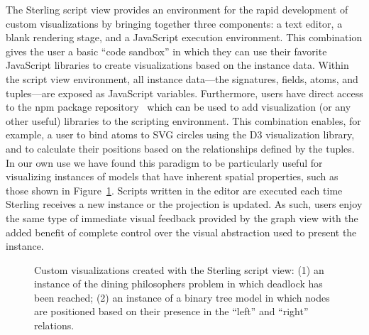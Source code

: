 \documentclass[runningheads]{llncs}
\newcommand{\dummyfiglarge}[1]{
  \centering
  \fbox{
    \begin{minipage}[c][0.35\textheight][c]{0.5\textwidth}
      \centering{#1}
    \end{minipage}
  }
}
\begin{document}
The Sterling script view provides an environment for the rapid development of custom visualizations by bringing together three components: a text editor, a blank rendering stage, and a JavaScript execution environment. 
This combination gives the user a basic ``code sandbox'' in which they can use their favorite JavaScript libraries to create visualizations based on the instance data. Within the script view environment, all instance data---the signatures, fields, atoms, and tuples---are exposed as JavaScript variables. 
Furthermore, users have direct access to the npm package repository~\cite{npm} which can be used to add visualization (or any other useful) libraries to the scripting environment.
This combination enables, for example, a user to bind atoms to SVG circles using the D3 visualization library, and to calculate their positions based on the relationships defined by the tuples.
In our own use we have found this paradigm to be particularly useful for visualizing instances of models that have inherent spatial properties, such as those shown in Figure~\ref{fig:script}.
Scripts written in the editor are executed each time Sterling receives a new instance or the projection is updated. 
As such, users enjoy the same type of immediate visual feedback provided by the graph view with the added benefit of complete control over the visual abstraction used to present the instance.

\begin{figure}
    \centering
    \dummyfiglarge{Script View Example}
    \caption{Custom visualizations created with the Sterling script view: (1) an instance of the dining philosophers problem in which deadlock has been reached; (2) an instance of a binary tree model in which nodes are positioned based on their presence in the ``left'' and ``right'' relations.}
    \label{fig:script}
\end{figure}

\end{document}
